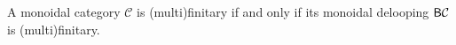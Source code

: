 


\noindent A monoidal category $\mathcal{C}$ is (multi)finitary if and only if its monoidal delooping $\textnormal{\textsf{B}}\mathcal{C}$ is (multi)finitary.\\


